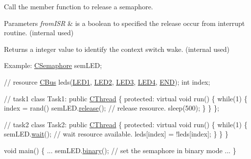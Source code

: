 Call the member function to release a semaphore. 
\begin{DoxyParams}{Parameters}
{\em from\-I\-S\-R} & is a boolean to specified the release occur from interrupt routine. (internal used) \\
\hline
\end{DoxyParams}
\begin{DoxyReturn}{Returns}
a integer value to identify the context switch wake. (internal used)
\end{DoxyReturn}

\begin{DoxyCode}
Example:
        \hyperlink{class_c_semaphore}{CSemaphore} semLED;

        \textcolor{comment}{// resource}
        \hyperlink{class_c_bus}{CBus} leds(\hyperlink{group___peripheral_gga65a2241721e4acb573e0c3fe29ac432fadac6477842247cab1a8c02c65f431b44}{LED1}, \hyperlink{group___peripheral_gga65a2241721e4acb573e0c3fe29ac432fa8379bbaa96d151e6adac488b2a147b7a}{LED2}, \hyperlink{group___peripheral_gga65a2241721e4acb573e0c3fe29ac432fa5dec293e081e0fc78369c842fab8452b}{LED3}, \hyperlink{group___peripheral_gga65a2241721e4acb573e0c3fe29ac432fad60e39b8d1701d30aa64f80343217342}{LED4}, \hyperlink{group___peripheral_gga65a2241721e4acb573e0c3fe29ac432fadc6f24fd6915a3f2786a1b7045406924}{END});
        \textcolor{keywordtype}{int}  index;

        \textcolor{comment}{// task1}
        \textcolor{keyword}{class }Task1: \textcolor{keyword}{public} \hyperlink{class_c_thread}{CThread} \{
        \textcolor{keyword}{protected}:
            \textcolor{keyword}{virtual} \textcolor{keywordtype}{void} run() \{
                \textcolor{keywordflow}{while}(1) \{
                    index = rand() %
                    semLED.\hyperlink{class_c_semaphore_aa1a25ff1be26f8dfdd0f008aeabec8b1}{release}();       \textcolor{comment}{// release resource.}
                    sleep(500);
                \}
            \}
        \};

        \textcolor{comment}{// task2}
        \textcolor{keyword}{class }Task2: \textcolor{keyword}{public} \hyperlink{class_c_thread}{CThread} \{
    \textcolor{keyword}{protected}:
            \textcolor{keyword}{virtual} \textcolor{keywordtype}{void} run() \{
                \textcolor{keywordflow}{while}(1) \{
                    semLED.\hyperlink{class_c_semaphore_abad6f22e40a0d911e38ade968f4d801a}{wait}();          \textcolor{comment}{// wait resource available.}
                    leds[index] = !leds[index];
                \}
            \}
        \}

        \textcolor{keywordtype}{void} main() \{
            ...
            semLED.\hyperlink{class_c_semaphore_a0fc078dfd286cb3321c6cbaf7bcbb7b2}{binary}();    \textcolor{comment}{// set the semaphore in binary mode}
            ...
        \}
\end{DoxyCode}
